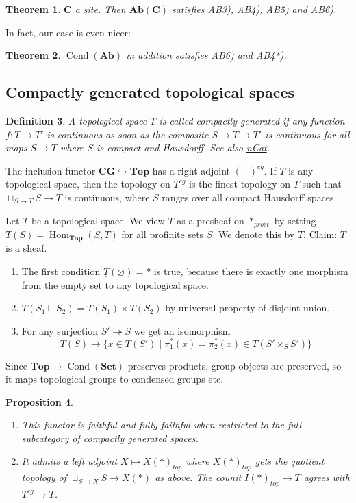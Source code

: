 \documentclass[12pt]{article}
\theoremstyle{darkgreentheorem}
\newtheorem{thm}{Theorem}[section]
\newtheorem{prop}[thm]{Proposition}
\theoremstyle{darkbluedefinition}
\newtheorem{defn}[thm]{Definition}
\theoremstyle{darkredexample}
\theoremstyle{remark}
\newcommand{\1}{\mathbbm{1}}
\newcommand{\bfC}{\mathbf{C}}
\newcommand{\Top}{\mathbf{Top}}
\newcommand{\CG}{\mathbf{CG}}
\newcommand{\Ab}{\mathbf{Ab}}
\newcommand{\Set}{\mathbf{Set}}
\DeclareMathOperator{\Hom}{Hom}
\DeclareMathOperator{\Cond}{Cond}
\newcommand{\pe}{*_{proét}}
\renewcommand{\u}[1]{\underline{#1}}
\newcommand{\fp}[1]{\times_{#1}}
\begin{document}
\begin{thm}
    $\bfC$ a site. Then $\Ab(\bfC)$ satisfies AB3), AB4), AB5) and AB6).
\end{thm}

In fact, our case is even nicer:

\begin{thm}
    $\Cond(\Ab)$ in addition satisfies AB6) and AB4*).
\end{thm}

\subsection{Compactly generated topological spaces}

\begin{defn}
    A topological space $T$ is called \textit{compactly generated} if any function $f\colon T\to T'$ is continuous as soon as the composite $S\to T\to T'$ is continuous for all maps $S\to T$ where $S$ is compact and Hausdorff.
    See also \href{https://ncatlab.org/nlab/show/compactly+generated+topological+space}{nCat}.
\end{defn}

The inclusion functor $\CG \hookrightarrow \Top$ has a right adjoint $(-)^{cg}$.
If $T$ is any topological space, then the topology on $T^{cg}$ is the finest topology on $T$ such that $\sqcup_{S\to T}S\to T$ is continuous, where $S$ ranges over all compact Hausdorff spaces.

Let $T$ be a topological space.
We view $T$ as a presheaf on $\pe$ by setting $T(S)=\Hom_{\Top}(S,T)$ for all profinite sets $S$.
We denote this by $\u{T}$.
Claim: $\u{T}$ is a sheaf.
\begin{enumerate}[label=\roman*)]
    \item The first condition $\u{T}(\varnothing)=*$ is true, because there is exactly one morphism from the empty set to any topological space.
    \item $\u{T}(S_{1}\sqcup S_{2})=\u{T}(S_{1})\times \u{T}(S_{2})$ by universal property of disjoint union.
    \item For any surjection $S'\twoheadrightarrow S$ we get an isomorphism
	\[ \u{T}(S)\to \{ x\in \u{T}(S')\mid \pi_{1}^{*}(x)=\pi_{2}^{*}(x)\in \u{T}(S'\fp{S}S')\}\]
\end{enumerate}

Since $\Top\to \Cond(\Set)$ preserves products, group objects are preserved, so it maps topological groups to condensed groups etc.

\begin{prop}
    \begin{enumerate}[label=\roman*)]
	\item This functor is faithful and fully faithful when restricted to the full subcategory of compactly generated spaces.
	\item It admits a left adjoint $X\mapsto X(*)_{top}$ where $X(*)_{top}$ gets the quotient topology of $\sqcup_{S\to X}S\to X(*)$ as above.
	    The counit $I(*)_{top}\to T$ agrees with $T^{cg}\to T$.
    \end{enumerate}
\end{prop}
\end{document}
